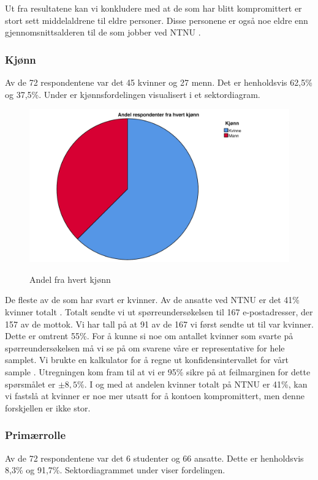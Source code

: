 Ut fra resultatene kan vi konkludere med at de som har blitt kompromittert er stort sett middelaldrene til eldre personer. Disse personene er også noe eldre enn gjennomsnittsalderen til de som jobber ved NTNU \cite{MorkRapport}. 

\subsubsection{Kjønn}
Av de 72 respondentene var det 45 kvinner og 27 menn. Det er henholdsvis 62,5\% og 37,5\%. Under er kjønnsfordelingen visualisert i et sektordiagram.

\begin{figure}[H]
    \centering
    \includegraphics[scale=0.5]{case_2/bilder/spss/kjonn.pdf}
    \label{fig:case2-kjonn}
    \caption[Andel fra hvert kjønn av de kompromitterte]{Andel fra hvert kjønn}
\end{figure}

De fleste av de som har svart er kvinner. Av de ansatte ved NTNU er det 41\% kvinner totalt \cite{NTNUfakta}. Totalt sendte vi ut spørreundersøkelsen til 167 e-postadresser, der 157 av de mottok. Vi har tall på at 91 av de 167 vi først sendte ut til var kvinner. Dette er omtrent 55\%. For å kunne si noe om antallet kvinner som svarte på spørreundersøkelsen må vi se på om svarene våre er representative for hele samplet. Vi brukte en kalkulator for å regne ut konfidensintervallet for vårt sample \cite{SSCalc}. Utregningen kom fram til at vi er 95\% sikre på at feilmarginen for dette spørsmålet er \(\pm 8,5\%\). I og med at andelen kvinner totalt på NTNU er 41\%, kan vi fastslå at kvinner er noe mer utsatt for å kontoen kompromittert, men denne forskjellen er ikke stor.

\subsubsection{Primærrolle}
Av de 72 respondentene var det 6 studenter og 66 ansatte. Dette er henholdsvis 8,3\% og 91,7\%. Sektordiagrammet under viser fordelingen.

